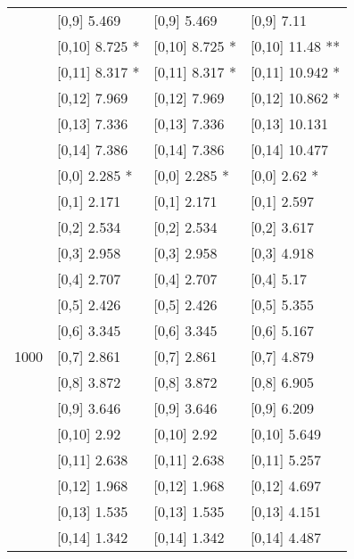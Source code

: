 \begin{table}
\begin{tabular}[t]{llll}
 & {}[0,9] 5.469 & {}[0,9] 5.469 & {}[0,9] 7.11\\
\addlinespace
 & {}[0,10] 8.725 * & {}[0,10] 8.725 * & {}[0,10] 11.48 **\\
 & {}[0,11] 8.317 * & {}[0,11] 8.317 * & {}[0,11] 10.942 *\\
 & {}[0,12] 7.969 & {}[0,12] 7.969 & {}[0,12] 10.862 *\\
 & {}[0,13] 7.336 & {}[0,13] 7.336 & {}[0,13] 10.131\\
 & {}[0,14] 7.386 & {}[0,14] 7.386 & {}[0,14] 10.477\\
\addlinespace
 & {}[0,0] 2.285 * & {}[0,0] 2.285 * & {}[0,0] 2.62 *\\
 & {}[0,1] 2.171 & {}[0,1] 2.171 & {}[0,1] 2.597\\
 & {}[0,2] 2.534 & {}[0,2] 2.534 & {}[0,2] 3.617\\
 & {}[0,3] 2.958 & {}[0,3] 2.958 & {}[0,3] 4.918\\
 & {}[0,4] 2.707 & {}[0,4] 2.707 & {}[0,4] 5.17\\
\addlinespace
 & {}[0,5] 2.426 & {}[0,5] 2.426 & {}[0,5] 5.355\\
 & {}[0,6] 3.345 & {}[0,6] 3.345 & {}[0,6] 5.167\\
1000 & {}[0,7] 2.861 & {}[0,7] 2.861 & {}[0,7] 4.879\\
 & {}[0,8] 3.872 & {}[0,8] 3.872 & {}[0,8] 6.905\\
 & {}[0,9] 3.646 & {}[0,9] 3.646 & {}[0,9] 6.209\\
\addlinespace
 & {}[0,10] 2.92 & {}[0,10] 2.92 & {}[0,10] 5.649\\
 & {}[0,11] 2.638 & {}[0,11] 2.638 & {}[0,11] 5.257\\
 & {}[0,12] 1.968 & {}[0,12] 1.968 & {}[0,12] 4.697\\
 & {}[0,13] 1.535 & {}[0,13] 1.535 & {}[0,13] 4.151\\
 & {}[0,14] 1.342 & {}[0,14] 1.342 & {}[0,14] 4.487\\
\bottomrule
\end{tabular}
\end{table}
